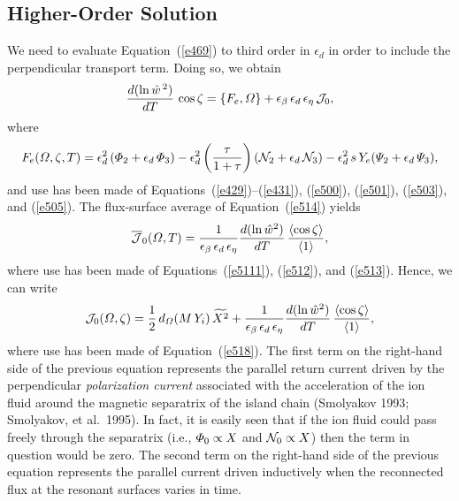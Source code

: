\documentclass[notitlepage,12pt]{article}
\begin{document}
\subsection{Higher-Order Solution}
We need to evaluate Equation~(\ref{e469}) to third order in $\epsilon_d$ in order to include the perpendicular transport term. Doing so,
we obtain
\begin{equation}\label{e514}
\frac{d(\ln \hat{w}^{\,2})}{dT}\,\cos\zeta = \{F_e, {\mit\Omega}\} + \epsilon_\beta\,\epsilon_d\,\epsilon_\eta\,{\cal J}_0,
\end{equation}
where
\begin{equation}
F_e({\mit\Omega},\zeta,T)= \epsilon_d^2\,({\mit\Phi}_2+\epsilon_d\,{\mit\Phi}_3)-\epsilon_d^{2}\left(\frac{\tau}{1+\tau}\right)({\cal N}_2+\epsilon_d\,{\cal N}_3)
- \epsilon_d^2\,s\,Y_e({\mit\Psi}_2+\epsilon_d\,{\mit\Psi}_3),
\end{equation}
and use has been made of Equations~(\ref{e429})--(\ref{e431}), (\ref{e500}), (\ref{e501}), (\ref{e503}), and (\ref{e505}). 
The flux-surface average of Equation~(\ref{e514}) yields
\begin{equation}
\overline{\cal J}_0({\mit\Omega},T) = \frac{1}{\epsilon_\beta\,\epsilon_d\,\epsilon_\eta}\frac{d(\ln \hat{w}^{2})}{dT}\,\frac{\langle\cos\zeta\rangle}{\langle 1\rangle},
\end{equation}
where use has been made of Equations~(\ref{e5111}), (\ref{e512}), and (\ref{e513}). Hence, we
can write
\begin{equation}\label{e524a}
{\cal J}_0({\mit\Omega},\zeta)= 
\frac{1}{2}\,d_{\mit\Omega}\!\left(M\,Y_i\right)\widetilde{X^2}+ \frac{1}{\epsilon_\beta\,\epsilon_d\,\epsilon_\eta}\frac{d(\ln \hat{w}^{2})}{dT}\,\frac{\langle\cos\zeta\rangle}{\langle 1\rangle},
\end{equation}
where use has been made of Equation~(\ref{e518}). 
The first term on the right-hand side of the previous equation represents the parallel return current driven by the perpendicular {\em polarization current}\/ associated with the
acceleration of the ion fluid around the magnetic separatrix of the island chain (Smolyakov 1993; Smolyakov, et al.\ 1995). 
In fact, it is easily seen that if the ion fluid could pass freely through the separatrix (i.e., ${\mit\Phi}_0\propto X$ and ${\cal N}_0\propto X$) then the term in question would be zero. The second term on the right-hand side of the previous equation represents the parallel current driven
inductively when the reconnected flux at the resonant surfaces varies in time. 
\end{document}
